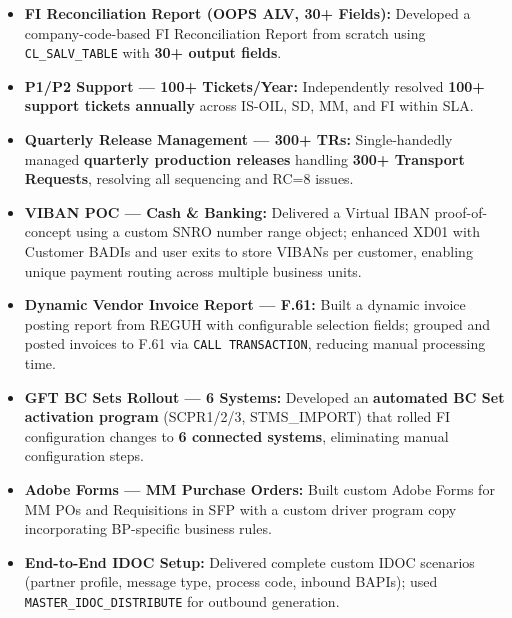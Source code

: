 \documentclass[10pt, a4paper]{article}
\begin{document}
\begin{itemize}
  \item \textbf{FI Reconciliation Report (OOPS ALV, 30+ Fields):}
        Developed a company-code-based FI Reconciliation Report from scratch
        using \texttt{CL\_SALV\_TABLE} with \textbf{30+ output fields}.

  \item \textbf{P1/P2 Support --- 100+ Tickets/Year:}
        Independently resolved \textbf{100+ support tickets annually} across
        IS-OIL, SD, MM, and FI within SLA.

  \item \textbf{Quarterly Release Management --- 300+ TRs:}
        Single-handedly managed \textbf{quarterly production releases} handling
        \textbf{300+ Transport Requests}, resolving all sequencing and RC=8 issues.

  \item \textbf{VIBAN POC --- Cash \& Banking:}
        Delivered a Virtual IBAN proof-of-concept using a custom SNRO number range
        object; enhanced XD01 with Customer BADIs and user exits to store VIBANs
        per customer, enabling unique payment routing across multiple business units.

  \item \textbf{Dynamic Vendor Invoice Report --- F.61:}
        Built a dynamic invoice posting report from REGUH with configurable
        selection fields; grouped and posted invoices to F.61 via
        \texttt{CALL TRANSACTION}, reducing manual processing time.

  \item \textbf{GFT BC Sets Rollout --- 6 Systems:}
        Developed an \textbf{automated BC Set activation program} (SCPR1/2/3,
        STMS\_IMPORT) that rolled FI configuration changes to \textbf{6 connected
        systems}, eliminating manual configuration steps.

  \item \textbf{Adobe Forms --- MM Purchase Orders:}
        Built custom Adobe Forms for MM POs and Requisitions in SFP with a custom
        driver program copy incorporating BP-specific business rules.

  \item \textbf{End-to-End IDOC Setup:}
        Delivered complete custom IDOC scenarios (partner profile, message type,
        process code, inbound BAPIs); used
        \texttt{MASTER\_IDOC\_DISTRIBUTE} for outbound generation.
\end{itemize}
\end{document}
